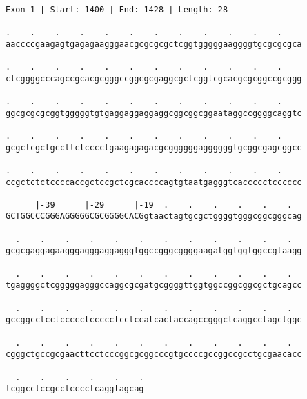 \documentclass{article}
\begin{document}
 \begin{Verbatim}
 
Exon 1 | Start: 1400 | End: 1428 | Length: 28
 
.    .    .    .    .    .    .    .    .    .    .    .    
aaccccgaagagtgagagaagggaacgcgcgcgctcggtgggggaaggggtgcgcgcgca
                                                            
.    .    .    .    .    .    .    .    .    .    .    .    
ctcggggcccagccgcacgcgggccggcgcgaggcgctcggtcgcacgcgcggccgcggg
                                                            
.    .    .    .    .    .    .    .    .    .    .    .    
ggcgcgcgcggtgggggtgtgaggaggaggaggcggcggcggaataggccggggcaggtc
                                                            
.    .    .    .    .    .    .    .    .    .    .    .    
gcgctcgctgccttctcccctgaagagagacgcggggggaggggggtgcggcgagcggcc
                                                            
.    .    .    .    .    .    .    .    .    .    .    .    
ccgctctctccccaccgctccgctcgcaccccagtgtaatgagggtcaccccctcccccc
                                                            
      |-39      |-29      |-19  .    .    .    .    .    .  
GCTGGCCCGGGAGGGGGCGCGGGGCACGgtaactagtgcgctggggtgggcggcgggcag
                                                            
  .    .    .    .    .    .    .    .    .    .    .    .  
gcgcgaggagaagggagggaggagggtggccgggcggggaagatggtggtggccgtaagg
                                                            
  .    .    .    .    .    .    .    .    .    .    .    .  
tgaggggctcgggggagggccaggcgcgatgcggggttggtggccggcggcgctgcagcc
                                                            
  .    .    .    .    .    .    .    .    .    .    .    .  
gccggcctcctccccctccccctcctccatcactaccagccgggctcaggcctagctggc
                                                            
  .    .    .    .    .    .    .    .    .    .    .    .  
cgggctgccgcgaacttcctcccggcgcggcccgtgccccgccggccgcctgcgaacacc
                                                            
  .    .    .    .    .    .
tcggcctccgcctcccctcaggtagcag
                            
                            
 

\end{Verbatim}
\end{document}
